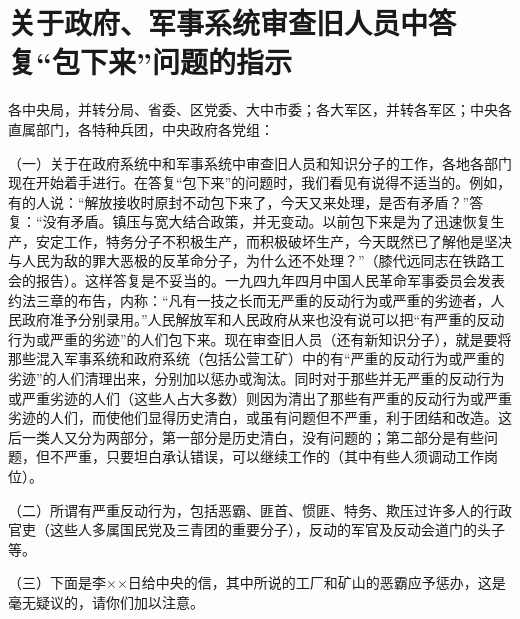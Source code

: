 \section[关于政府、军事系统审查旧人员中答复“包下来”问题的指示（一九五一年四月二十日）]{关于政府、军事系统审查旧人员中答复“包下来”问题的指示}


各中央局，并转分局、省委、区党委、大中市委；各大军区，并转各军区；中央各直属部门，各特种兵团，中央政府各党组：

（一）关于在政府系统中和军事系统中审查旧人员和知识分子的工作，各地各部门现在开始着手进行。在答复“包下来”的问题时，我们看见有说得不适当的。例如，有的人说：“解放接收时原封不动包下来了，今天又来处理，是否有矛盾？”答复：“没有矛盾。镇压与宽大结合政策，并无变动。以前包下来是为了迅速恢复生产，安定工作，特务分子不积极生产，而积极破坏生产，今天既然已了解他是坚决与人民为敌的罪大恶极的反革命分子，为什么还不处理？”（膝代远同志在铁路工会的报告）。这样答复是不妥当的。一九四九年四月中国人民革命军事委员会发表约法三章的布告，内称：“凡有一技之长而无严重的反动行为或严重的劣迹者，人民政府准予分别录用。”人民解放军和人民政府从来也没有说可以把“有严重的反动行为或严重的劣迹”的人们包下来。现在审查旧人员（还有新知识分子），就是要将那些混入军事系统和政府系统（包括公营工矿）中的有“严重的反动行为或严重的劣迹”的人们清理出来，分别加以惩办或淘汰。同时对于那些并无严重的反动行为或严重劣迹的人们（这些人占大多数）则因为清出了那些有严重的反动行为或严重劣迹的人们，而使他们显得历史清白，或虽有问题但不严重，利于团结和改造。这后一类人又分为两部分，第一部分是历史清白，没有问题的；第二部分是有些问题，但不严重，只要坦白承认错误，可以继续工作的（其中有些人须调动工作岗位）。

（二）所谓有严重反动行为，包括恶霸、匪首、惯匪、特务、欺压过许多人的行政官吏（这些人多属国民党及三青团的重要分子），反动的军官及反动会道门的头子等。

（三）下面是李××日给中央的信，其中所说的工厂和矿山的恶霸应予惩办，这是毫无疑议的，请你们加以注意。



